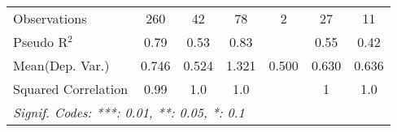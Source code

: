 \begin{tabular}{lcccccc}
   Observations                                               & 260         & 42            & 78      & 2    & 27            & 11\\  
   Pseudo R$^2$                                               & 0.79        & 0.53          & 0.83    &      & 0.55          & 0.42\\  
Mean(Dep. Var.) & 0.746 & 0.524 & 1.321 & 0.500 & 0.630 & 0.636 \\
   Squared Correlation                                        & 0.99        & 1.0           & 1.0     &      & 1             & 1.0\\  
   \midrule \midrule
   \multicolumn{7}{l}{\emph{Signif. Codes: ***: 0.01, **: 0.05, *: 0.1}}\\
\end{tabular}
\par\endgroup
